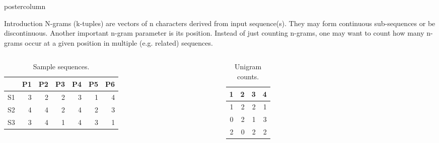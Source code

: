 \documentclass[final]{beamer}\usepackage[]{graphicx}\usepackage[]{color}
\newlength{\columnheight}
\begin{document}
\begin{frame}
  \begin{columns}
    \begin{column}{.49\textwidth}
      \begin{beamercolorbox}[center,wd=\textwidth]{postercolumn}
        \begin{minipage}[T]{.95\textwidth}
          \parbox[t][\columnheight]{\textwidth}
            {
    
        
    \begin{block}{Introduction}
      N-grams (k-tuples) are vectors of n characters derived from input sequence(s). They may form continuous sub-sequences or be discontinuous. Another important n-gram parameter is its position. Instead of just counting n-grams, one may want to count how many n-grams occur at a given position in multiple (e.g. related) sequences.

\small{
       \begin{columns}[c] %
\begin{table}[ht]
\centering
\begin{tabular}{rrrrrrr}
  \hline
 & P1 & P2 & P3 & P4 & P5 & P6 \\ 
  \hline
S1 & 3 & 2 & 2 & 3 & 1 & 4 \\ 
  S2 & 4 & 4 & 2 & 4 & 2 & 3 \\ 
  S3 & 3 & 4 & 1 & 4 & 3 & 1 \\ 
   \hline
\end{tabular}
\caption{Sample sequences.} 
\end{table}

      
      

    
\begin{table}[ht]
\centering
\begin{tabular}{rrrr}
  \hline
1 & 2 & 3 & 4 \\ 
  \hline
1 & 2 & 2 & 1 \\ 
  0 & 2 & 1 & 3 \\ 
  2 & 0 & 2 & 2 \\ 
   \hline
\end{tabular}
\caption{Unigram counts.} 
\end{table}



\end{columns}}
\end{block}}
\end{minipage}
\end{beamercolorbox}
\end{column}
\end{columns}
\end{frame}
\end{document}
